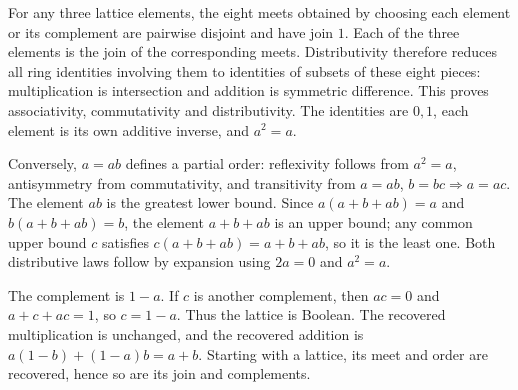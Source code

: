 For any three lattice elements, the eight meets obtained by choosing each element or its complement are pairwise disjoint and have join $1$. Each of the three elements is the join of the corresponding meets. Distributivity therefore reduces all ring identities involving them to identities of subsets of these eight pieces: multiplication is intersection and addition is symmetric difference. This proves associativity, commutativity and distributivity. The identities are $0,1$, each element is its own additive inverse, and $a^2=a$.

Conversely, $a=ab$ defines a partial order: reflexivity follows from $a^2=a$, antisymmetry from commutativity, and transitivity from $a=ab$, $b=bc\Rightarrow a=ac$. The element $ab$ is the greatest lower bound. Since $a(a+b+ab)=a$ and $b(a+b+ab)=b$, the element $a+b+ab$ is an upper bound; any common upper bound $c$ satisfies $c(a+b+ab)=a+b+ab$, so it is the least one. Both distributive laws follow by expansion using $2a=0$ and $a^2=a$.

The complement is $1-a$. If $c$ is another complement, then $ac=0$ and $a+c+ac=1$, so $c=1-a$. Thus the lattice is Boolean. The recovered multiplication is unchanged, and the recovered addition is $a(1-b)+(1-a)b=a+b$. Starting with a lattice, its meet and order are recovered, hence so are its join and complements.
